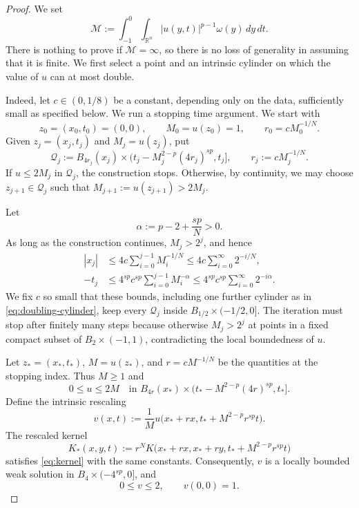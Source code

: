 \documentclass[10pt]{amsart}
\theoremstyle{plain}
\theoremstyle{definition}
\theoremstyle{remark}
\numberwithin{equation}{section}
\newcommand{\R}{\mathbb R}
\begin{document}
\begin{proof}
We set
\[
\mathcal M
:=
\int_{-1}^0\int_{\R^n}
|u(y,t)|^{p-1}\omega(y)\,dy\,dt.
\]
There is nothing to prove if $\mathcal M=\infty$, so there is no loss of generality in assuming that 
it is finite. We first select a point and an intrinsic cylinder on which the value
of $u$ can at most double.

Indeed, let $c\in(0,1/8)$ be a constant, depending only on the data, sufficiently
small as specified below. We run a stopping time argument. We start with
\[
z_0=(x_0,t_0)=(0,0),
\qquad
M_0=u(z_0)=1,
\qquad
r_0=cM_0^{-1/N}.
\]
Given $z_j=(x_j,t_j)$ and $M_j=u(z_j)$, put
\begin{equation}\label{eq:doubling-cylinder}
\mathcal Q_j
:=
B_{4r_j}(x_j)
\times
\bigl(t_j-M_j^{2-p}(4r_j)^{sp},t_j\bigr],
\qquad
r_j:=cM_j^{-1/N}.
\end{equation}
If $u\le2M_j$ in $\mathcal Q_j$, the construction stops. Otherwise, by
continuity, we may choose $z_{j+1}\in\mathcal Q_j$ such that
$M_{j+1}:=u(z_{j+1})>2M_j$.

Let
\[
\alpha:=p-2+\frac{sp}{N}>0.
\]
As long as the construction continues, $M_j>2^j$, and hence
\begin{align*}
|x_j|
&\le
4c\sum_{i=0}^{j-1}M_i^{-1/N}
\le
4c\sum_{i=0}^\infty2^{-i/N},
\\
-t_j
&\le
4^{sp}c^{sp}
\sum_{i=0}^{j-1}M_i^{-\alpha}
\le
4^{sp}c^{sp}
\sum_{i=0}^\infty2^{-i\alpha}.
\end{align*}
We fix $c$ so small that these bounds, including one further cylinder as in
\eqref{eq:doubling-cylinder}, keep every $\mathcal Q_j$ inside
$B_{1/2}\times(-1/2,0]$. The iteration must stop after finitely many steps
because otherwise $M_j>2^j$ at points in a fixed compact subset of
$B_2\times(-1,1)$, contradicting the local boundedness of $u$.

Let $z_*=(x_*,t_*)$, $M=u(z_*)$, and $r=cM^{-1/N}$ be the quantities at the
stopping index. Thus $M\ge1$ and
\begin{equation}\label{eq:doubling-bound}
0\le u\le2M
\quad\text{in }
B_{4r}(x_*)
\times
\bigl(t_*-M^{2-p}(4r)^{sp},t_*\bigr].
\end{equation}
Define the intrinsic rescaling
\begin{equation}\label{eq:moment-rescaling}
v(x,t)
:=
\frac1M
u\bigl(x_*+rx,t_*+M^{2-p}r^{sp}t\bigr).
\end{equation}
The rescaled kernel
\[
K_*(x,y,t)
:=
r^N
K\bigl(x_*+rx,x_*+ry,t_*+M^{2-p}r^{sp}t\bigr)
\]
satisfies \eqref{eq:kernel} with the same constants. Consequently, $v$ is a
locally bounded weak solution in $B_4\times(-4^{sp},0]$, and
\begin{equation}\label{eq:rescaled-local-bounds}
0\le v\le2,
\qquad
v(0,0)=1.
\end{equation}


\end{proof}
\end{document}
